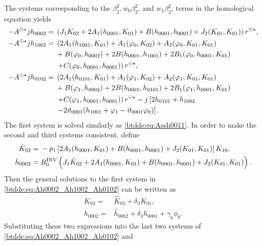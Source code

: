 The systems corresponding to the $\beta_2^2, w_0\beta_2^2$, and $w_1\beta_2^2$,
terms in the homological equation yields
\begin{equation}
\label{btdde:eq:Ah0002_Ah1002_Ah0102}
\begin{aligned}
-A^{\odot\star} jh_{0002}={}&  \left(J_1K_{02} + 2A_1(h_{0001},K_{01})
							 + B(h_{0001},h_{0001}) + J_2(K_{01},K_{01})\right)r^{\odot\star}, \\
-A^{\odot\star} jh_{1002}={}& \left( 2A_1(h_{1001},K_{01}) + A_1(\varphi_0,K_{02}) + A_2(\varphi_0,K_{01},K_{01}) \right.
					 \\ & + B(\varphi_0,h_{0002}) + 2B(h_{0001},h_{1001}) +
					 2B_1(\varphi_0,h_{0001},K_{01}) \\
  & \left. + C(\varphi_0,h_{0001},h_{0001}) \right)r^{\odot\star}, \\
-A^{\odot\star} jh_{0102}={}& \left( 2A_1(h_{0101},K_{01}) + A_1(\varphi_1,K_{02}) + A_2(\varphi_1,K_{01},K_{01}) \right. \\
  & + B(\varphi_1,h_{0002}) + 2B(h_{0001},h_{0101}) + 2B_1(\varphi_1,h_{0001},K_{01}) \\
  & \left. + C(\varphi_1,h_{0001},h_{0001})\right)r^{\odot\star} -j \left[ 2h_{0101} + h_{1002} \right. \\
  & \left. -2\vartheta_{0001} (h_{1001} + \varphi_1 - \vartheta_{0001}\varphi_0) \right].
\end{aligned}
\end{equation}
The first system is solved similarly as \cref{btdde:eq:Assh0011}. In order to make the second and third systems
consistent, define
\begin{equation*}
\begin{aligned}
\hat K_{02}={}&-p_1\left[2A_1(h_{0001},K_{01}) + B(h_{0001},h_{0001})
				+J_2(K_{01},K_{01})\right]K_{10}, \\
                \hat h_{0002} ={}& B^{\mathrm{INV}}_{0} \left( J_1 \hat K_{02} + 2A_1(h_{0001},K_{01})
                + B(h_{0001},h_{0001}) + J_2(K_{01},K_{01})\right).
\end{aligned}
\end{equation*}
Then the general solutions to the first system in \cref{btdde:eq:Ah0002_Ah1002_Ah0102}
can be written as
\begin{equation*}
\begin{aligned}
				K_{02}={}& \hat K_{02} + \delta_3 K_{01}, \\
				h_{0002}={}& \hat h_{0002} +  \delta_3 h_{0001} + \gamma_6 \phi_0.
\end{aligned}
\end{equation*}
Substituting these two expressions into the last two systems of \cref{btdde:eq:Ah0002_Ah1002_Ah0102} and
